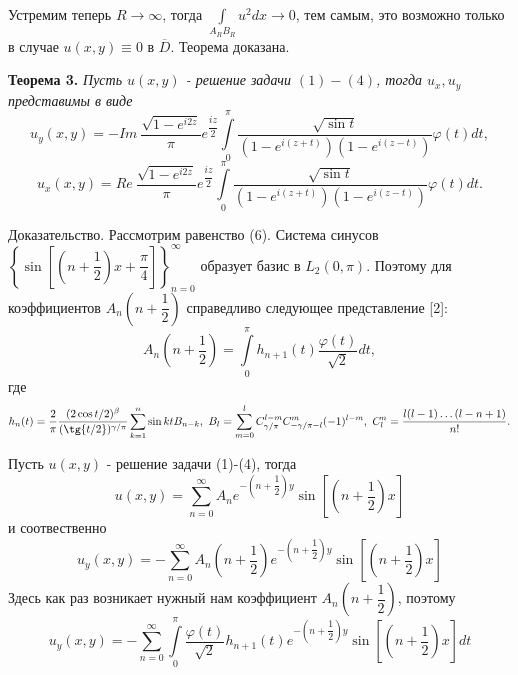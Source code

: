\documentclass[a4paper, 9pt]{article}
\begin{document}
		Устремим теперь $R \to \infty$, тогда $\int\limits_{A_RB_R} u^2 dx \to 0$, тем самым, это возможно только в случае $u(x,y) \equiv 0$ в $\overline{D}$. Теорема доказана.
		\par
		\textbf{Теорема 3.} \textit{Пусть $u(x,y)$ - решение задачи $(1)-(4)$, тогда $u_x, u_y$ представимы в виде}
		\begin{equation}
			u_y(x,y) = - Im\  \dfrac{ \sqrt{1 - e^{i2z}} }{\pi} e^{\dfrac{iz}{2}} \int\limits_0^\pi  \dfrac{\sqrt{\sin{t}}}{\left(1 - e^{i(z+t)} \right) \left(1 - e^{i(z-t)}\right)}  \varphi(t) dt, 
		\end{equation}
		\begin{equation}
			u_x(x,y) = Re\   \dfrac{ \sqrt{1 - e^{i2z}} }{\pi} e^{\dfrac{iz}{2}} \int\limits_0^\pi  \dfrac{\sqrt{\sin{t}}}{\left(1 - e^{i(z+t)} \right) \left(1 - e^{i(z-t)}\right)}  \varphi(t) dt.
		\end{equation}
		\par
		Доказательство. Рассмотрим равенство (6). Система синусов $\left\{\sin{\left[\left(n +\dfrac12\right)x + \dfrac\pi4\right]}\right\}_{n=0}^{\infty}$ образует базис в $L_2(0,\pi)$. Поэтому для коэффициентов $A_n\left(n+\dfrac12\right)$ справедливо следующее представление [2]:
		\begin{equation*}
			A_n\left(n+\dfrac12\right) = \int\limits_0^\pi h_{n+1}(t) \dfrac{\varphi(t)}{\sqrt2} dt, 
		\end{equation*}
		где
		\begin{equation*}
			h_n(t) = \dfrac{2}{\pi}\dfrac{(2\cos{t/2})^\beta}{(\tg{t/2})^{\gamma/\pi}} \sum\limits_{k=1}^n \sin{kt} B_{n-k}, \ B_{l} = \sum\limits_{m=0}^{l} C_{\gamma/\pi}^{l-m} C_{-\gamma / \pi -l}^{m} (-1)^{l-m}, \ C_l^n = \dfrac{l(l-1)\dots (l-n+1)}{n!}. 
		\end{equation*}
		\par
		Пусть $u(x,y)$ - решение задачи (1)-(4), тогда
		\begin{equation*}
			u(x,y) = \sum\limits_{n=0}^{\infty} A_n e^{-\left(n + \dfrac12\right)y} \sin{\left[\left(n + \dfrac12\right)x\right]}
		\end{equation*}
		и соотвественно
		\begin{equation*}
			u_y(x,y) = -\sum\limits_{n=0}^{\infty} A_n \left(n +\dfrac12\right) e^{-\left(n + \dfrac12\right)y} \sin{\left[\left(n + \dfrac12\right)x\right]}
		\end{equation*}
		Здесь как раз возникает нужный нам коэффициент $A_n \left(n+\dfrac12\right)$, поэтому
		\begin{equation*}
			u_y(x,y)  = - \sum\limits_{n=0}^{\infty}  \int\limits_0^\pi \dfrac{\varphi(t)}{\sqrt2}  h_{n+1}(t)  e^{-\left(n + \dfrac12\right)y} \sin{\left[\left(n + \dfrac12\right)x\right]} dt
		\end{equation*}
\end{document}
